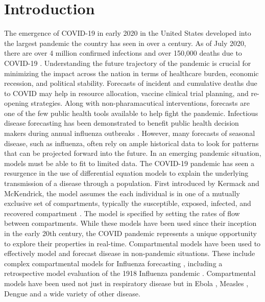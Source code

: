 \documentclass[11pt]{amsart}
\begin{document}

\section{Introduction}

The emergence of COVID-19 in early 2020 in the United States developed into the largest pandemic the country has seen in over a century. As of July 2020, there are over 4 million confirmed infections and over 150,000 deaths due to COVID-19 \cite{dong2020interactive}.  Understanding the future trajectory of the pandemic is crucial for minimizing the impact across the nation in terms of healthcare burden, economic recession, and political stability. Forecasts of incident and cumulative deaths due to COVID may help in resource allocation, vaccine clinical trial planning, and re-opening strategies. Along with non-pharamacutical interventions, forecasts are one of the few public health tools available to help fight the pandemic. Infectious disease forecasting has been demonstrated to benefit public health decision makers during annual influenza outbreaks \cite{lutz2019applying}.  However, many forecasts of seasonal disease, such as influenza, often rely on ample historical data to look for patterns that can be projected forward into the future. In an emerging pandemic situation, models must be able to fit to limited data. The COVID-19 pandemic has seen a resurgence in the use of differential equation models to explain the underlying transmission of a disease through a population. First introduced by  Kermack and McKendrick, the model assumes the each individual is in one of a mutually exclusive set of compartments, typically the susceptible, exposed, infected, and recovered compartment \cite{kermack1927contribution}. The model is specified by setting the rates of flow between compartments. While these models have been used since their inception in the early 20th century, the COVID pandemic represents a unique opportunity to explore their properties in real-time. 
Compartmental models have been used to effectively model and forecast disease in non-pandemic situations. These include complex compartmental models for Influenza forecasting \cite{shaman2012forecasting}\cite{osthus2017forecasting}\cite{ong2010real}, including a retrospective model evaluation of the 1918 Influenza pandemic \cite{hall2007real}. Compartmental models have been used not just in respiratory disease but in Ebola \cite{lekone2006statistical}, Measles \cite{bokler1993chaos}, Dengue \cite{syafruddin2012seir} and a wide variety of other disease.
\end{document}
